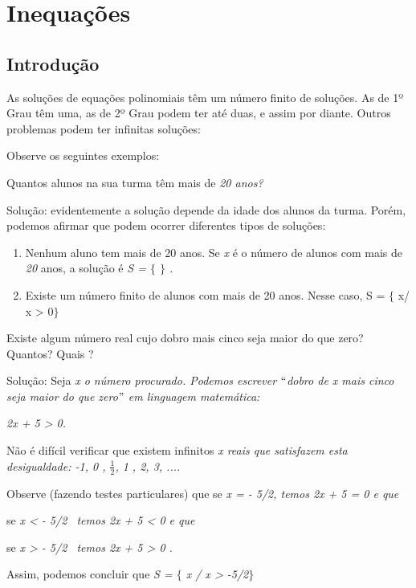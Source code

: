 \chapter{Inequações}

\section{Introdução}

As soluções de equações polinomiais têm um número finito de soluções. As de 1º Grau têm uma, as de 2º Grau podem ter até duas, e assim por diante. Outros problemas podem ter infinitas soluções:

Observe os seguintes exemplos:

\begin{texemplo}
Quantos alunos na sua turma têm mais de \textit{20 anos?}

Solução: evidentemente a solução depende da idade dos alunos da turma. Porém, podemos afirmar que podem ocorrer diferentes tipos de soluções:

\begin{enumerate}
	\item Nenhum aluno tem mais de 20 anos. Se \textit{x }é o número de alunos com mais de \textit{20} anos, a solução é \textit{S = $ \{ $ $ \} $ .}

	\item Existe um número finito de alunos com mais de 20 anos. Nesse caso, S = $ \{ $ x/ x > 0$ \} $ \qedsymbol{} 
\end{enumerate}
\end{texemplo}

\begin{texemplo}
Existe algum número real cujo dobro mais cinco seja maior do que zero? Quantos? Quais ?

Solução: Seja \textit{x o número procurado. Podemos escrever $``$dobro de x mais cinco seja maior do que zero$"$  em linguagem matemática:}

\textit{2x + 5 > 0. }

Não é difícil verificar que existem infinitos \textit{x reais que satisfazem esta desigualdade: -1, 0 , $\frac{1}{2}$, 1 , 2, 3, ....}

Observe (fazendo testes particulares) que se \textit{x = - 5/2, temos 2x + 5 = 0 e que }

se \textit{x < - 5/2~ temos 2x + 5 < 0 e que }

se \textit{x > - 5/2~ temos 2x + 5 > 0 .}

Assim, podemos concluir que \textit{S = $ \{ $ x  / x > -5/2$ \} $ \qedsymbol{}}
\end{texemplo}

